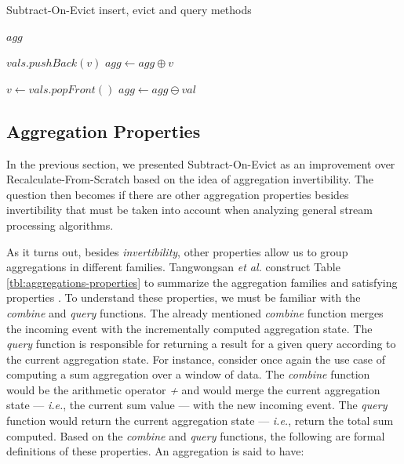\begin{algorithm}
    \caption[Subtract-On-Evict]{Subtract-On-Evict insert, evict and query methods}
    \label{pseudo:soe}
    \begin{algorithmic}[1]
            \State \Return $agg$
        \EndFunction
        
            \State $vals.pushBack(v)$
            \State $agg \gets agg \oplus v$
        \EndFunction
        
            \State $v \gets vals.popFront()$
            \State $agg \gets agg \ominus val$
        \EndFunction
    \end{algorithmic}
\end{algorithm}

\subsection{Aggregation Properties}
\label{sec:agg-properties}

In the previous section, we presented Subtract-On-Evict as an improvement over Recalculate-From-Scratch based on the idea of aggregation invertibility. The question then becomes if there are other aggregation properties besides invertibility that must be taken into account when analyzing general stream processing algorithms.

As it turns out, besides \textit{invertibility}, other properties allow us to group aggregations in different families. Tangwongsan \emph{et al.} construct Table \ref{tbl:aggregations-properties} to summarize the aggregation families and satisfying properties \cite{Tangwongsan-Sliding-Window-Aggregation-Algorithms}. To understand these properties, we must be familiar with the \textit{combine} and \textit{query} functions. The already mentioned \textit{combine} function merges the incoming event with the incrementally computed aggregation state. The \textit{query} function is responsible for returning a result for a given query according to the current aggregation state. For instance, consider once again the use case of computing a sum aggregation over a window of data. The \textit{combine} function would be the arithmetic operator \textit{+} and would merge the current aggregation state --- \textit{i.e.}, the current sum value --- with the new incoming event. The \textit{query} function would return the current aggregation state --- \textit{i.e.}, return the total sum computed. Based on the \textit{combine} and \textit{query} functions, the following are formal definitions of these properties. An aggregation is said to have:

